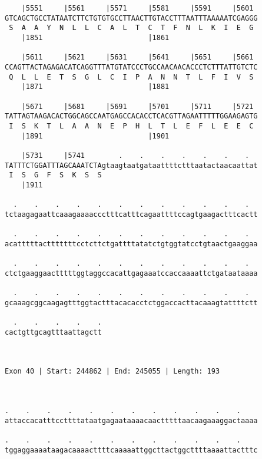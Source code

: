 \documentclass{article}
\begin{document}
\begin{Verbatim}
    |5551     |5561     |5571     |5581     |5591     |5601 
GTCAGCTGCCTATAATCTTCTGTGTGCCTTAACTTGTACCTTTAATTTAAAAATCGAGGG
 S  A  A  Y  N  L  L  C  A  L  T  C  T  F  N  L  K  I  E  G 
    |1851                         |1861                     
  
    |5611     |5621     |5631     |5641     |5651     |5661 
CCAGTTACTAGAGACATCAGGTTTATGTATCCCTGCCAACAACACCCTCTTTATTGTCTC
 Q  L  L  E  T  S  G  L  C  I  P  A  N  N  T  L  F  I  V  S 
    |1871                         |1881                     
  
    |5671     |5681     |5691     |5701     |5711     |5721 
TATTAGTAAGACACTGGCAGCCAATGAGCCACACCTCACGTTAGAATTTTTGGAAGAGTG
 I  S  K  T  L  A  A  N  E  P  H  L  T  L  E  F  L  E  E  C 
    |1891                         |1901                     
  
    |5731     |5741        .    .    .    .    .    .    .  
TATTTCTGGATTTAGCAAATCTAgtaagtaatgataattttctttaatactaacaattat
 I  S  G  F  S  K  S  S                                     
    |1911                                                   
  
  .    .    .    .    .    .    .    .    .    .    .    .  
tctaagagaattcaaagaaaaccctttcatttcagaattttccagtgaagactttcactt
                                                            
  .    .    .    .    .    .    .    .    .    .    .    .  
acatttttactttttttcctcttctgattttatatctgtggtatcctgtaactgaaggaa
                                                            
  .    .    .    .    .    .    .    .    .    .    .    .  
ctctgaaggaactttttggtaggccacattgagaaatccaccaaaattctgataataaaa
                                                            
  .    .    .    .    .    .    .    .    .    .    .    .  
gcaaagcggcaagagtttggtactttacacacctctggaccacttacaaagtattttctt
                                                            
  .    .    .    .    .
cactgttgcagtttaattagctt
                       
                       
 
Exon 40 | Start: 244862 | End: 245055 | Length: 193



.    .    .    .    .    .    .    .    .    .    .    .    
attaccacatttccttttataatgagaataaaacaactttttaacaagaaaggactaaaa
                                                            
.    .    .    .    .    .    .    .    .    .    .    .    
tggaggaaaataagacaaaacttttcaaaaattggcttactggcttttaaaattactttc
                                                            

\end{Verbatim}
\end{document}
